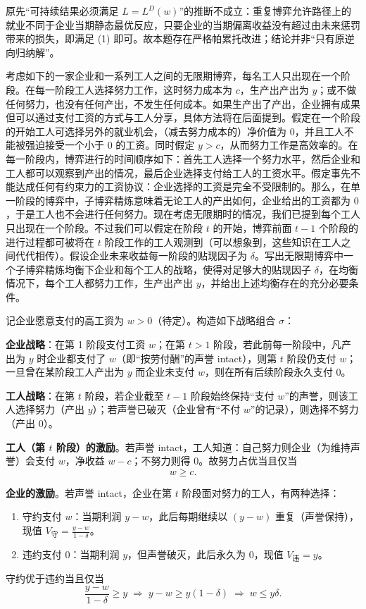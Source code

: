 原先“可持续结果必须满足 $L=L^D(w)$”的推断不成立：重复博弈允许路径上的就业不同于企业当期静态最优反应，只要企业的当期偏离收益没有超过由未来惩罚带来的损失，即满足 (1) 即可。故本题存在严格帕累托改进；结论并非“只有原逆向归纳解”。

考虑如下的一家企业和一系列工人之间的无限期博弈，每名工人只出现在一个阶段。在每一阶段工人选择努力工作，这时努力成本为 $c$，生产出产出为 $y$；或不做任何努力，也没有任何产出，不发生任何成本。如果生产出了产出，企业拥有成果但可以通过支付工资的方式与工人分享，具体方法将在后面提到。假定在一个阶段的开始工人可选择另外的就业机会，（减去努力成本的）净价值为 $0$，并且工人不能被强迫接受一个小于 $0$ 的工资。同时假定 $y>c$，从而努力工作是高效率的。在每一阶段内，博弈进行的时间顺序如下：首先工人选择一个努力水平，然后企业和工人都可以观察到产出的情况，最后企业选择支付给工人的工资水平。假定事先不能达成任何有约束力的工资协议：企业选择的工资是完全不受限制的。那么，在单一阶段的博弈中，子博弈精炼意味着无论工人的产出如何，企业给出的工资都为 $0$，于是工人也不会进行任何努力。现在考虑无限期时的情况，我们已提到每个工人只出现在一个阶段。不过我们可以假定在阶段 $t$ 的开始，博弈前面 $t-1$ 个阶段的进行过程都可被将在 $t$ 阶段工作的工人观测到（可以想象到，这些知识在工人之间代代相传）。假设企业未来收益每一阶段的贴现因子为 $\delta$。写出无限期博弈中一个子博弈精炼均衡下企业和每个工人的战略，使得对足够大的贴现因子 $\delta$，在均衡情况下，每个工人都努力工作，生产出产出 $y$，并给出上述均衡存在的充分必要条件。

\sol
记企业愿意支付的高工资为 $w>0$（待定）。构造如下战略组合 $\sigma$：

\textbf{企业战略}：在第 1 阶段支付工资 $w$；在第 $t>1$ 阶段，若此前每一阶段中，凡产出为 $y$ 时企业都支付了 $w$（即“按劳付酬”的声誉 intact），则第 $t$ 阶段仍支付 $w$；一旦曾在某阶段工人产出为 $y$ 而企业未支付 $w$，则在所有后续阶段永久支付 $0$。

\textbf{工人战略}：在第 $t$ 阶段，若企业截至 $t-1$ 阶段始终保持“支付 $w$”的声誉，则该工人选择努力（产出 $y$）；若声誉已破灭（企业曾有“不付 $w$”的记录），则选择不努力（产出 $0$）。

\textbf{工人（第 $t$ 阶段）的激励}。若声誉 intact，工人知道：自己努力则企业（为维持声誉）会支付 $w$，净收益 $w-c$；不努力则得 $0$。故努力占优当且仅当
\[
w\ge c.\tag{1}
\]

\textbf{企业的激励}。若声誉 intact，企业在第 $t$ 阶段面对努力的工人，有两种选择：
\begin{enumerate}[leftmargin=*]
  \item 守约支付 $w$：当期利润 $y-w$，此后每期继续以 $(y-w)$ 重复（声誉保持），现值
        $\displaystyle V_{\text{守}}=\frac{y-w}{1-\delta}$。
  \item 违约支付 $0$：当期利润 $y$，但声誉破灭，此后永久为 $0$，现值
        $\displaystyle V_{\text{违}}=y$。
\end{enumerate}
守约优于违约当且仅当
\[
\frac{y-w}{1-\delta}\ge y
\;\Longrightarrow\;
y-w\ge y(1-\delta)
\;\Longrightarrow\;
w\le y\delta.\tag{2}
\]

